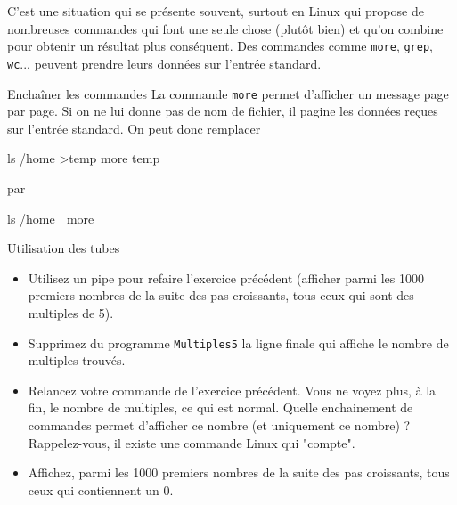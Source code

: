 \documentclass[a4paper,11pt]{article}
\begin{document}
			C'est une situation qui se pr\'esente souvent, surtout en Linux qui propose de nombreuses
			commandes qui font une seule chose (plut\^ot bien) et qu'on combine pour obtenir 
			un r\'esultat plus cons\'equent. Des commandes comme \verb_more_, \verb_grep_,
			\verb_wc_... peuvent prendre leurs donn\'ees sur l'entr\'ee standard.
					
          
		\begin{Exemple}{Enchaîner les commandes} 
			La commande \verb_more_ permet d'afficher un message page par page.
			Si on ne lui donne pas de nom de fichier, il pagine les donn\'ees re\c cues sur l'entr\'ee standard. 
			On peut donc remplacer
				
                  	 \begin{Console}
				ls /home >temp
				more temp
			\end{Console}
					par
				
                		 \begin{Console}
				ls /home | more
			\end{Console}
			
		\end{Exemple}
			
		\begin{Exercice}{Utilisation des tubes}
				\begin{itemize}
				
						\item Utilisez un pipe pour refaire l'exercice pr\'ec\'edent
						(afficher parmi les 1000 premiers nombres de la suite des pas croissants,
						tous ceux qui sont des multiples de 5).
					
						\item Supprimez du programme \verb_Multiples5_
							la ligne finale qui affiche le nombre de multiples trouv\'es. 
					
						\item Relancez votre commande de l'exercice pr\'ec\'edent.
							Vous ne voyez plus, \`a la fin, le nombre de multiples, ce qui est normal.
							Quelle enchainement de commandes permet d'afficher ce nombre
							(et uniquement ce nombre) ? Rappelez-vous, il existe une commande Linux qui "compte". 
					
						\item Affichez, parmi les 1000 premiers nombres 
							de la suite des pas croissants, tous ceux qui contiennent un 0.
					
					\end{itemize}
	\end{Exercice}
\end{document}
